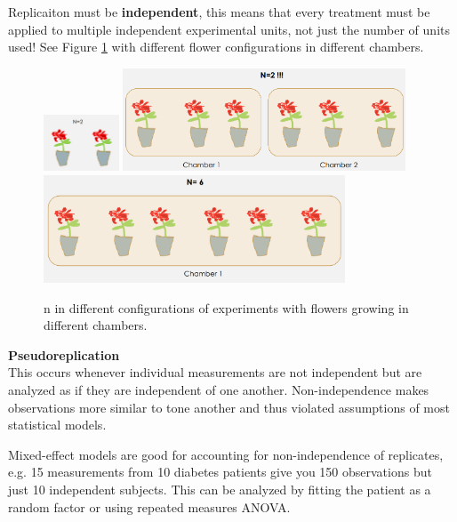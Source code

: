 \documentclass{article}
\begin{document}
Replicaiton must be \textbf{independent}, this means that every treatment must be applied to multiple independent experimental units, not just the number of units used! See Figure \ref{flowers} with different flower configurations in different chambers.
\begin{figure}[H]
\centering
\label{flowers}
\includegraphics[width = 0.2\textwidth]{exp-design/replicationplant.png}
\includegraphics[width = 0.75\textwidth]{exp-design/replicationplants2.png}
\includegraphics[width = 0.8\textwidth]{exp-design/replicationplants6.png}
\caption{n in different configurations of experiments with flowers growing in different chambers.}
\end{figure}

\textbf{Pseudoreplication} \\
This occurs whenever individual measurements are not independent but are analyzed as if they are independent of one another. Non-independence makes observations more similar to tone another and thus violated assumptions of most statistical models.\par 
Mixed-effect models are good for accounting for non-independence of replicates, e.g. 15 measurements from 10 diabetes patients give you 150 observations but just 10 independent subjects. This can be analyzed by fitting the patient as a random factor or using repeated measures ANOVA.\par 
\end{document}
